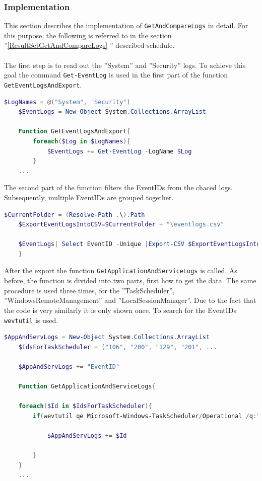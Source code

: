 \subsubsection{Implementation}
This section describes the implementation of \lstinline|GetAndCompareLogs| in detail. For this purpose, the following is referred to in the section ''\ref{ResultSetGetAndCompareLogs} '' described schedule.
\\\\
The first step is to read out the ''System'' and ''Security'' logs. To achieve this goal the command \lstinline|Get-EventLog| is used in the first part of the function \lstinline|GetEventLogsAndExport|.
\begin{lstlisting}[caption=Function GetEventLogsAndExport Part 1, language=PowerShell]
    $LogNames = @("System", "Security")
    $EventLogs = New-Object System.Collections.ArrayList

    Function GetEventLogsAndExport{
        foreach($Log in $LogNames){
            $EventLogs += Get-EventLog -LogName $Log
        }
    ...
\end{lstlisting}
The second part of the function filters the EventIDs from the chaced logs. Subsequently, multiple EventIDs are grouped together.
\begin{lstlisting}[caption=Function GetEventLogsAndExport Part 2, language=PowerShell]
    $CurrentFolder = (Resolve-Path .\).Path
    $ExportEventLogsIntoCSV=$CurrentFolder + "\eventlogs.csv"

    $EventLogs| Select EventID -Unique |Export-CSV $ExportEventLogsIntoCSV -NoTypeInfo -Encoding UTF8
    }
\end{lstlisting}
After the export the function \lstinline|GetApplicationAndServiceLogs| is called. As before, the function is divided into two parts, first how to get the data. The same procedure is used three times, for the ''TaskScheduler'', ''WindowsRemoteManagement'' and ''LocalSessionManager''. Due to the fact that the code is very similarly it is only shown once. To search for the EventIDs  \lstinline|wevtutil| is used.
\begin{lstlisting}[caption=Function GetApplicationAndServiceLogs Part 1, language=PowerShell]
    $AppAndServLogs = New-Object System.Collections.ArrayList
    $IdsForTaskScheduler = ("106", "200", "129", "201", ...

    $AppAndServLogs += "EventID"

    Function GetApplicationAndServiceLogs{
    
    foreach($Id in $IdsForTaskScheduler){
        if(wevtutil qe Microsoft-Windows-TaskScheduler/Operational /q:"*[System[(EventID="$Id" )]]" /uni:false /f:text){

            $AppAndServLogs += $Id

        }
    }
    ...
\end{lstlisting}
